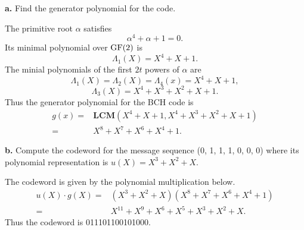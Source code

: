 \documentclass[12pt]{article}
\theoremstyle{plain}
\begin{document}
{\bf a.} Find the generator polynomial for the code.

\Sol The primitive root $\alpha$ satisfies
$$\alpha^4 + \alpha + 1 =0.$$
Its minimal polynomial over $\textrm{GF}(2)$ is
$$\Lambda_1(X) = X^4 + X + 1.$$
The minial polynomials of the first $2t$ powers of $\alpha$ are
$$\Lambda_1(X) = \Lambda_2(X) = \Lambda_4(x) = X^4 + X + 1,$$
$$\Lambda_3(X) = X^4 + X^3 + X^2 + X + 1.$$
Thus the generator polynomial for the BCH code is 
$$\begin{aligned}
g(x) =& \mathbf{LCM}(X^4 + X + 1, X^4 + X^3 + X^2 + X + 1)\\
=& X^8 + X^7 + X^6 + X^4 + 1.
\end{aligned}$$

{\bf b.} Compute the codeword for the message sequence (0, 1, 1, 1, 0, 0, 0)
where its polynomial representation is $u(X) = X^3 + X^2 + X$.

\Sol The codeword is given by the polynomial multiplication below.
$$\begin{aligned}
u(X)\cdot g(X) =& (X^3 + X^2 + X)(X^8 + X^7 + X^6 + X^4 + 1)\\
=& X^{11} + X^9 + X^6+ X^5 + X^3 + X^2 + X.
\end{aligned}$$
Thus the codeword is 011101100101000.
\end{document}
